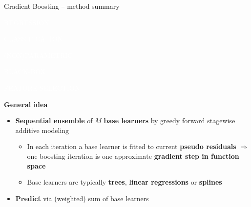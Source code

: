 \documentclass[11pt,compress,t,notes=noshow, xcolor=table]{beamer}
\newcommand{\highlight}[1]{\textcolor{hlcol}{\textbf{#1}}}
\newcommand{\maketag}[2][100]{
  \colorbox{hlcol!#1}{\textcolor{white}{\MakeUppercase{\scriptsize #2}} 
  \vphantom{}}
}
\begin{document}
\begin{frame2}{Gradient Boosting -- method summary}
\maketag{regression} \maketag{classification}
\maketag[50]{(NON)PARAMETRIC}
\maketag{BLACK-BOX}
\maketag{FEATURE SELECTION}



\highlight{General idea}

\begin{itemize}
  \item \textbf{Sequential ensemble} of $M$ \textbf{base learners} by greedy forward stagewise additive modeling
  \begin{itemize}
      \item In each iteration a base learner is fitted to current \textbf{pseudo residuals} $\Rightarrow$ one boosting iteration is one approximate \textbf{gradient step in function space}
      \item Base learners are typically \textbf{trees}, \textbf{linear regressions} or \textbf{splines}
  \end{itemize}
  \item \textbf{Predict} via (weighted) sum of base learners
  
\end{itemize}

\end{frame2}
\end{document}
